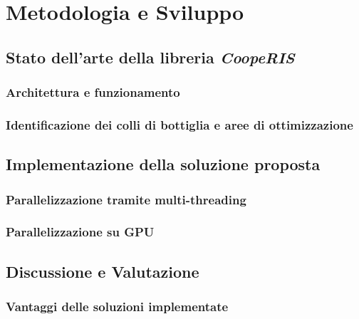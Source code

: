 \chapter{Metodologia e Sviluppo}
\label{ch:metodologiasviluppo}

\section{Stato dell'arte della libreria \textit{CoopeRIS}}
\label{sec:libreria}

\lipsum[1]

\subsection{Architettura e funzionamento}
\label{sec:architettura}

\lipsum[1]

\subsection{Identificazione dei colli di bottiglia e aree di ottimizzazione}
\label{sec:ottimizzazione}

\lipsum[1]

\section{Implementazione della soluzione proposta}
\label{sec:implementazione}

\lipsum[1]

\subsection{Parallelizzazione tramite multi-threading}
\label{subsec:multithreading}

\lipsum[1]

\subsection{Parallelizzazione su GPU}
\label{subsec:cuda}

\lipsum[1]

\section{Discussione e Valutazione}
\label{ch:discussione}

\subsection{Vantaggi delle soluzioni implementate}
\label{subsec:vantaggi}

